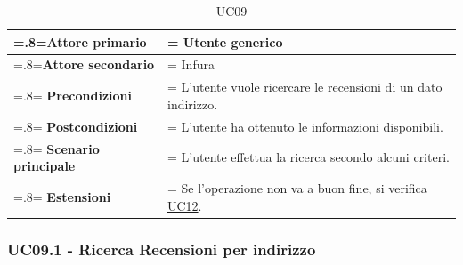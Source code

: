             \begin{table}[H]
                \centering
                \renewcommand{\arraystretch}{1.8}
                \renewcommand\tabularxcolumn[1]{m{#1}}
                \begin{tabularx}{0.9\textwidth} {
                    >{\hsize=.8\hsize\linewidth=\hsize}X
                    >{\hsize=1.2\hsize\linewidth=\hsize}X}
                    \hline
                    \textbf{Attore primario} & Utente generico \\
                    \hline
                    \textbf{Attore secondario} & Infura \\
                    \hline
                    \textbf{Precondizioni} & L'utente vuole ricercare le recensioni di un dato indirizzo. \\
                    \hline
                    \textbf{Postcondizioni} & L'utente ha ottenuto le informazioni disponibili. \\
                    \hline
                    \textbf{Scenario principale} & L'utente effettua la ricerca secondo alcuni criteri. \\
                    \hline
                    \textbf{Estensioni} & Se l'operazione non va a buon fine, si verifica \hyperref[UC12]{UC12}. \\
                    \hline
                \end{tabularx}
                \caption{UC09}
            \end{table}

        \subsubsection{UC09.1 - Ricerca Recensioni per indirizzo}
        \label{UC09.1}

